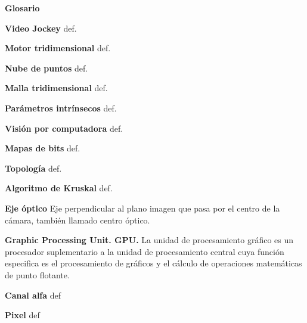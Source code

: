 ﻿\Huge
\textbf{Glosario}

\vspace{10 mm}

\normalsize 

\textbf{Video Jockey}
def. %

\textbf{Motor tridimensional}
def.
 
\textbf{Nube de puntos}
def.

\textbf{Malla tridimensional}
def.

\textbf{Parámetros intrínsecos}
def.

\textbf{Visión por computadora}
def.

\textbf{Mapas de bits}
def.

\textbf{Topología}
def.

\textbf{Algoritmo de Kruskal}
def.

\textbf{Eje óptico} 
Eje perpendicular al plano imagen que pasa por el centro de la cámara, también llamado centro óptico.

\textbf{Graphic Processing Unit. GPU.}
La unidad de procesamiento gráfico es un procesador suplementario a la unidad de procesamiento central cuya función especifica es el procesamiento de gráficos y el cálculo de operaciones matemáticas de punto flotante.

\textbf{Canal alfa}
def

\textbf{Pixel}
def
